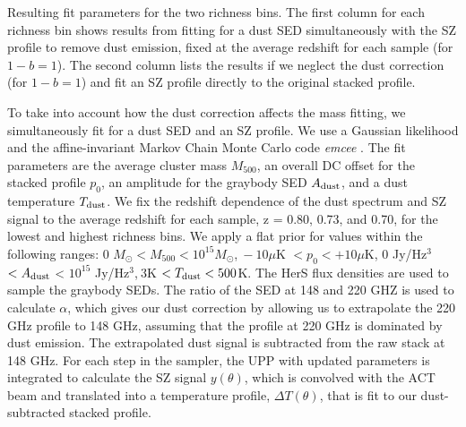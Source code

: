 \documentclass[a4paper,fleqn,usenatbib]{mnras}
\begin{document}
\begin{table}
\begin{threeparttable}
\begin{tabular}{|*{10}{c|}}
    \end{tabular}
  \begin{tablenotes}
	\item Resulting fit parameters for the two richness bins. The first column for each richness bin shows results from fitting for a dust SED simultaneously with the SZ profile to remove dust emission, fixed at the average redshift for each sample (for $1-b=1$). The second column lists the results if we neglect the dust correction (for $1-b=1$) and fit an SZ profile directly to the original stacked profile. %
  \end{tablenotes}
  \end{threeparttable}
\label{table:mcmcfitparam}
\end{table}


To take into account how the dust correction affects the mass fitting, we simultaneously fit for a dust SED and an SZ profile. We use a Gaussian likelihood and the affine-invariant Markov Chain Monte Carlo code \textit{emcee} \citep{2013PASP..125..306F}. The fit parameters are the average cluster mass $M_{500}$, an overall DC offset for the stacked profile $p_0$, an amplitude for the graybody SED $A_{\rm dust}$, and a dust temperature $T_{\rm dust}$. We fix the redshift dependence of the dust spectrum and SZ signal to the average redshift for each sample, z = 0.80, 0.73, and 0.70, for the lowest and highest richness bins. We apply a flat prior for values within the following ranges: 0 $M_{\odot} <  M_{500} < 10^{15} M_{\odot}$,$\ -10 \mu$K $< p_0 < +10 \mu$K, 0 Jy/Hz$^3$ $< A_{\rm dust}$ < $10^{15}$ Jy/Hz$^3$,$\ 3 $K $< T_{\rm dust} < 500$K. 
The HerS flux densities are used to sample the graybody SEDs. The ratio of the SED at 148 and 220 GHZ is used to calculate $\alpha$, which gives our dust correction by allowing us to extrapolate the 220 GHz profile to 148 GHz, assuming that the profile at 220 GHz is dominated by dust emission. The extrapolated dust signal is subtracted from the raw stack at 148 GHz.
For each step in the sampler, the UPP with updated parameters is integrated to calculate the SZ signal $y(\theta)$, which is convolved with the ACT beam and translated into a temperature profile, $\Delta T(\theta)$, that is fit to our dust-subtracted stacked profile. 
\end{document}
